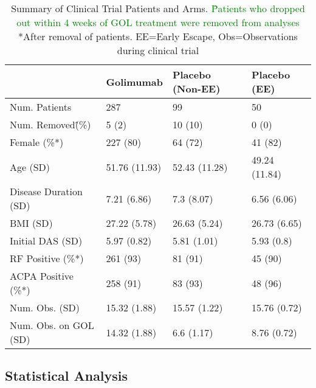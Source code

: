 \begin{table}
\centering
\def\arraystretch{1.2}
\begin{tabular}{| C{4cm} | C{2.5cm} | C{2.5cm} | C{2.5cm} | }
\hline
 & Golimumab & Placebo (Non-EE) & Placebo (EE) \\
\hline
Num. Patients & 287 & 99 & 50 \\
Num. Removed\^ (\%) & 5 (2) & 10 (10) & 0 (0) \\
Female (\%*) & 227 (80) & 64 (72) & 41 (82) \\
Age (SD) & 51.76 (11.93) & 52.43 (11.28) & 49.24 (11.84) \\
Disease Duration (SD) & 7.21 (6.86) & 7.3 (8.07) & 6.56 (6.06) \\
BMI (SD) & 27.22 (5.78) & 26.63 (5.24) & 26.73 (6.65) \\
Initial DAS (SD) & 5.97 (0.82) & 5.81 (1.01) & 5.93 (0.8) \\
RF Positive (\%*) & 261 (93) & 81 (91) & 45 (90) \\
ACPA Positive (\%*) & 258 (91) & 83 (93) & 48 (96) \\
Num. Obs. (SD) & 15.32 (1.88) & 15.57 (1.22) & 15.76 (0.72) \\
Num. Obs. on GOL (SD) & 14.32 (1.88) & 6.6 (1.17) & 8.76 (0.72) \\
\hline
\end{tabular}
\caption{\label{Summary_Table} Summary of Clinical Trial Patients and Arms. \textcolor{green}{\^Patients who dropped out within 4 weeks of GOL treatment were removed from analyses} *After removal of patients. EE=Early Escape, Obs=Observations during clinical trial}
\end{table}

\subsection*{Statistical Analysis}


